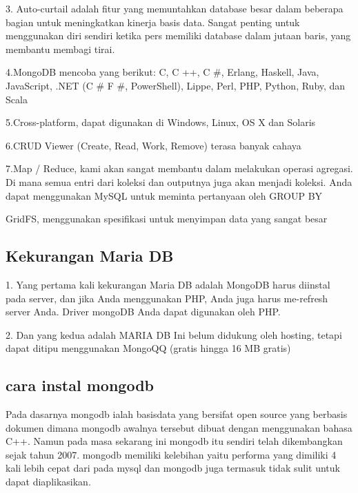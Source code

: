 3. Auto-curtail adalah fitur yang memuntahkan database besar dalam beberapa bagian untuk meningkatkan kinerja basis data. Sangat penting untuk menggunakan diri sendiri ketika pers memiliki database dalam jutaan baris, yang membantu membagi tirai.

4.MongoDB mencoba yang berikut: C, C ++, C #, Erlang, Haskell, Java, JavaScript, .NET (C # F #, PowerShell), Lippe, Perl, PHP, Python, Ruby, dan Scala

5.Cross-platform, dapat digunakan di Windows, Linux, OS X dan Solaris

6.CRUD Viewer (Create, Read, Work, Remove) terasa banyak cahaya

7.Map / Reduce, kami akan sangat membantu dalam melakukan operasi agregasi. Di mana semua entri dari koleksi dan outputnya juga akan menjadi koleksi. Anda dapat menggunakan MySQL untuk meminta pertanyaan oleh GROUP BY

GridFS, menggunakan spesifikasi untuk menyimpan data yang sangat besar

\subsection {Kekurangan Maria DB}
1.	Yang pertama kali kekurangan Maria DB adalah MongoDB harus diinstal pada server, dan jika Anda menggunakan PHP, Anda juga harus me-refresh server Anda. Driver mongoDB Anda dapat digunakan oleh PHP.

2.	Dan yang kedua adalah MARIA DB Ini belum didukung oleh hosting, tetapi dapat ditipu menggunakan MongoQQ (gratis hingga 16 MB gratis)

\subsection {cara instal mongodb}
	Pada dasarnya mongodb ialah basisdata yang bersifat open source yang berbasis dokumen dimana mongodb awalnya tersebut dibuat dengan menggunakan bahasa C++. Namun pada masa sekarang ini mongodb itu sendiri telah dikembangkan sejak tahun 2007. mongodb memiliki kelebihan yaitu performa yang dimiliki 4 kali lebih cepat dari pada mysql dan mongodb juga termasuk tidak sulit untuk dapat diaplikasikan.
	
